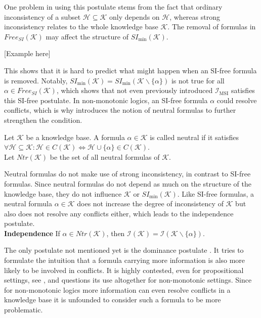 One problem in using this postulate stems from the fact that ordinary inconsistency of a subset \(\mathcal{H} \subseteq \mathcal{K}\) only depends on \(\mathcal{H}\), whereas strong inconsistency relates to the whole knowledge base \(\mathcal{K}\). The removal of formulas in \(Free_{SI}(\mathcal{K})\) may affect the structure of \(SI_{\min}(\mathcal{K})\).

    [Example here]

This shows that it is hard to predict what might happen when an SI-free formula is removed. Notably, \(SI_{\min}(\mathcal{K}) = SI_{\min}(\mathcal{K} \backslash \{\alpha\})\) is not true for all \(\alpha \in Free_{SI}(\mathcal{K})\), which shows that not even previously introduced \(\mathcal{I}_{\text{MSI}}\) satisfies this SI-free postulate. In non-monotonic logics, an SI-free formula \(\alpha\) could resolve conflicts, which is why \cite{brewka_strong_2017} introduces the notion of neutral formulas to further strengthen the condition.

\begin{definition}
    Let \(\mathcal{K}\) be a knowledge base. A formula \(\alpha \in \mathcal{K}\) is called neutral if it satisfies\\
    \(\forall \mathcal{H} \subseteq \mathcal{K}: \mathcal{H} \in C(\mathcal{K}) \Leftrightarrow \mathcal{H} \cup \{\alpha\} \in C(\mathcal{K})\).\\
    Let \(Ntr(\mathcal{K})\) be the set of all neutral formulas of \(\mathcal{K}\).
\end{definition}

Neutral formulas do not make use of strong inconsistency, in contrast to SI-free formulas. Since neutral formulas do not depend as much on the structure of the knowledge base, they do not influence \(\mathcal{K}\) or \(SI_{\min}(\mathcal{K})\). Like SI-free formulas, a neutral formula \(\alpha \in \mathcal{K}\) does not increase the degree of inconsistency of \(\mathcal{K}\) but also does not resolve any conflicts either, which leads to the independence postulate.
\\
\textbf{Independence}
If \(\alpha \in Ntr(\mathcal{K})\), then \(\mathcal{I}(\mathcal{K}) = \mathcal{I}(\mathcal{K} \backslash \{\alpha\})\).

The only postulate not mentioned yet is the dominance postulate \cite{hunter_measure_2010}. It tries to formulate the intuition that a formula carrying more information is also more likely to be involved in conflicts. It is highly contested, even for propositional settings, see \cite{ferme_revisiting_2014}, and \cite{ulbricht_measuring_2018} questions its use altogether for non-monotonic settings. Since for non-monotonic logics more information can even resolve conflicts in a knowledge base it is unfounded to consider such a formula to be more problematic.

